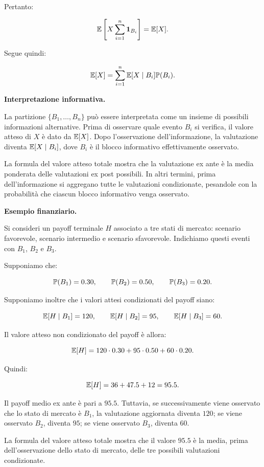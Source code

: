 Pertanto:

\[
\mathbb{E}\left[
X\sum_{i=1}^{n}\mathbf{1}_{B_i}
\right]
=
\mathbb{E}[X].
\]

Segue quindi:

\[
\mathbb{E}[X]
=
\sum_{i=1}^{n}
\mathbb{E}[X\mid B_i]\mathbb{P}(B_i).
\]

\medskip

\noindent
\textbf{Interpretazione informativa.}

La partizione $\{B_1,\ldots,B_n\}$ pu\`{o} essere interpretata come un insieme di possibili informazioni alternative. Prima di osservare quale evento $B_i$ si verifica, il valore atteso di $X$ \`{e} dato da $\mathbb{E}[X]$. Dopo l'osservazione dell'informazione, la valutazione diventa $\mathbb{E}[X\mid B_i]$, dove $B_i$ \`{e} il blocco informativo effettivamente osservato.

La formula del valore atteso totale mostra che la valutazione ex ante \`{e} la media ponderata delle valutazioni ex post possibili. In altri termini, prima dell'informazione si aggregano tutte le valutazioni condizionate, pesandole con la probabilit\`{a} che ciascun blocco informativo venga osservato.

\medskip

\noindent
\textbf{Esempio finanziario.}

Si consideri un payoff terminale $H$ associato a tre stati di mercato: scenario favorevole, scenario intermedio e scenario sfavorevole. Indichiamo questi eventi con $B_1$, $B_2$ e $B_3$.

Supponiamo che:

\[
\mathbb{P}(B_1)=0.30,
\qquad
\mathbb{P}(B_2)=0.50,
\qquad
\mathbb{P}(B_3)=0.20.
\]

Supponiamo inoltre che i valori attesi condizionati del payoff siano:

\[
\mathbb{E}[H\mid B_1]=120,
\qquad
\mathbb{E}[H\mid B_2]=95,
\qquad
\mathbb{E}[H\mid B_3]=60.
\]

Il valore atteso non condizionato del payoff \`{e} allora:

\[
\mathbb{E}[H]
=
120\cdot 0.30
+
95\cdot 0.50
+
60\cdot 0.20.
\]

Quindi:

\[
\mathbb{E}[H]
=
36
+
47.5
+
12
=
95.5.
\]

Il payoff medio ex ante \`{e} pari a $95.5$. Tuttavia, se successivamente viene osservato che lo stato di mercato \`{e} $B_1$, la valutazione aggiornata diventa $120$; se viene osservato $B_2$, diventa $95$; se viene osservato $B_3$, diventa $60$.

La formula del valore atteso totale mostra che il valore $95.5$ \`{e} la media, prima dell'osservazione dello stato di mercato, delle tre possibili valutazioni condizionate.

